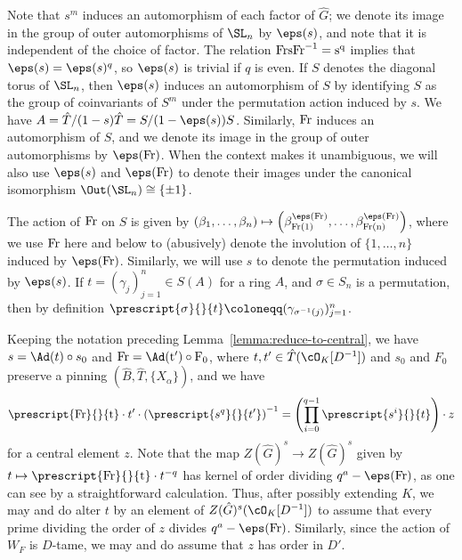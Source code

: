 Note that $s^m$ induces an automorphism of each factor of $\hat{G}$; we denote its image in the group of outer automorphisms of $\SL_n$ by $\eps(s)$, and note that it is independent of the choice of factor. The relation $\rm{Fr} s \rm{Fr}^{-1} = s^q$ implies that $\eps(s) = \eps(s)^q$, so $\eps(s)$ is trivial if $q$ is even. If $S$ denotes the diagonal torus of $\SL_n$, then $\eps(s)$ induces an automorphism of $S$ by identifying $S$ as the group of coinvariants of $S^m$ under the permutation action induced by $s$. We have $A = \hat{T}/(1 - s)\hat{T} = S/(1 - \eps(s))S$. Similarly, $\rm{Fr}$ induces an automorphism of $S$, and we denote its image in the group of outer automorphisms by $\eps(\rm{Fr})$. When the context makes it unambiguous, we will also use $\eps(s)$ and $\eps(\rm{Fr})$ to denote their images under the canonical isomorphism $\Out(\SL_n) \cong \{\pm 1\}$.\smallskip

The action of $\rm{Fr}$ on $S$ is given by $(\beta_1, \dots, \beta_n) \mapsto \left(\beta_{\rm{Fr}(1)}^{\eps(\rm{Fr})}, \dots, \beta_{\rm{Fr}(n)}^{\eps(\rm{Fr})}\right)$, where we use $\rm{Fr}$ here and below to (abusively) denote the involution of $\{1, \dots, n\}$ induced by $\eps(\rm{Fr})$. Similarly, we will use $s$ to denote the permutation induced by $\eps(s)$. If $t = (\gamma_j)_{j=1}^n \in S(A)$ for a ring $A$, and $\sigma \in S_n$ is a permutation, then by definition $\prescript{\sigma}{}{t} \coloneqq (\gamma_{\sigma^{-1}(j)})_{j=1}^n$.\smallskip

Keeping the notation preceding Lemma~\ref{lemma:reduce-to-central}, we have $s = \Ad(t) \circ s_0$ and $\rm{Fr} = \Ad(t') \circ F_0$, where $t, t' \in \hat{T}(\cO_K[D^{-1}])$ and $s_0$ and $F_0$ preserve a pinning $(\hat{B}, \hat{T}, \{X_\alpha\})$, and we have
\[
\prescript{\rm{Fr}}{}{t} \cdot t' \cdot \left(\prescript{s^q}{}{t'}\right)^{-1} = \left(\prod_{i=0}^{q-1} \prescript{s^i}{}{t}\right) \cdot z
\]
for a central element $z$. Note that the map $Z(\hat{G})^s \to Z(\hat{G})^s$ given by $t \mapsto \prescript{\rm{Fr}}{}{t} \cdot t^{-q}$ has kernel of order dividing $q^a - \eps(\rm{Fr})$, as one can see by a straightforward calculation. Thus, after possibly extending $K$, we may and do alter $t$ by an element of $Z(\hat{G})^s(\cO_K[D^{-1}])$ to assume that every prime dividing the order of $z$ divides $q^a - \eps(\rm{Fr})$. Similarly, since the action of $W_F$ is $D$-tame, we may and do assume that $z$ has order in $D'$.\smallskip

